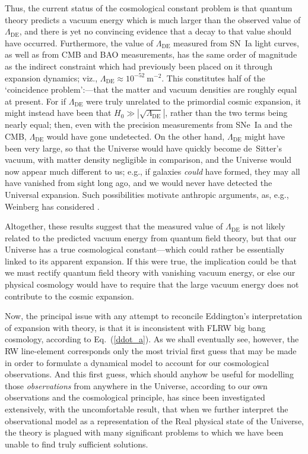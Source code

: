 Thus, the current status of the cosmological constant problem is that quantum theory predicts a vacuum energy which is much larger than the observed value of $\Lambda_{\mathrm{DE}}$, and there is yet no convincing evidence that a decay to that value should have occurred. Furthermore, the value of $\Lambda_{\mathrm{DE}}$ measured from SN~Ia light curves, as well as from CMB and BAO measurements, has the same order of magnitude as the indirect constraint which had previously been placed on it through expansion dynamics; viz., $\Lambda_{\mathrm{DE}}\approx10^{-52}~\mathrm{m}^{-2}$. This constitutes half of the `coincidence problem':---that the matter and vacuum densities are roughly equal at present. For if $\Lambda_{\mathrm{DE}}$ were truly unrelated to the primordial cosmic expansion, it might instead have been that $H_0\gg\left|\sqrt{\Lambda_{\mathrm{DE}}}\right|$, rather than the two terms being nearly equal; then, even with the precision measurements from SNe~Ia and the CMB, $\Lambda_{\mathrm{DE}}$ would have gone undetected. On the other hand, $\Lambda_{\mathrm{DE}}$ might have been very large, so that the Universe would have quickly become de~Sitter's vacuum, with matter density negligible in comparison, and the Universe would now appear much different to us; e.g., if galaxies \textit{could} have formed, they may all have vanished from sight long ago, and we would never have detected the Universal expansion. Such possibilities motivate anthropic arguments, as, e.g., Weinberg has considered \cite{Weinberg1989}.

Altogether, these results suggest that the measured value of $\Lambda_{\mathrm{DE}}$ is not likely related to the predicted vacuum energy from quantum field theory, but that our Universe has a true cosmological constant---which could rather be essentially linked to its apparent expansion. If this were true, the implication could be that we must rectify quantum field theory with vanishing vacuum energy, or else our physical cosmology would have to require that the large vacuum energy does not contribute to the cosmic expansion.

Now, the principal issue with any attempt to reconcile Eddington's interpretation of expansion with theory, is that it is inconsistent with FLRW big bang cosmology, according to Eq.~(\ref{ddot_a}). As we shall eventually see, however, the RW line-element corresponds only the most trivial first guess that may be made in order to formulate a dynamical model to account for our cosmological observations. And this first guess, which should anyhow be useful for modelling those \textit{observations} from anywhere in the Universe, according to our own observations and the cosmological principle, has since been investigated extensively, with the uncomfortable result, that when we further interpret the observational model as a representation of the Real physical state of the Universe, the theory is plagued with many significant problems to which we have been unable to find truly sufficient solutions. 


